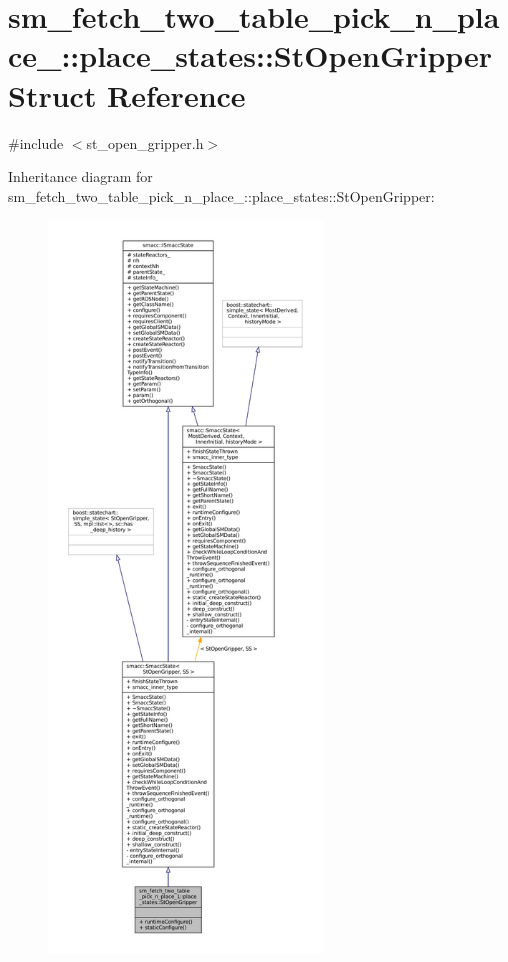 \hypertarget{structsm__fetch__two__table__pick__n__place__1_1_1place__states_1_1StOpenGripper}{}\section{sm\+\_\+fetch\+\_\+two\+\_\+table\+\_\+pick\+\_\+n\+\_\+place\+\_\+:\+:place\+\_\+states\+:\+:St\+Open\+Gripper Struct Reference}
\label{structsm__fetch__two__table__pick__n__place__1_1_1place__states_1_1StOpenGripper}


{\ttfamily \#include $<$st\+\_\+open\+\_\+gripper.\+h$>$}



Inheritance diagram for sm\+\_\+fetch\+\_\+two\+\_\+table\+\_\+pick\+\_\+n\+\_\+place\+\_\+:\+:place\+\_\+states\+:\+:St\+Open\+Gripper\+:
\nopagebreak
\begin{figure}[H]
\begin{center}
\leavevmode
\includegraphics[height=550pt]{structsm__fetch__two__table__pick__n__place__1_1_1place__states_1_1StOpenGripper__inherit__graph}
\end{center}
\end{figure}


